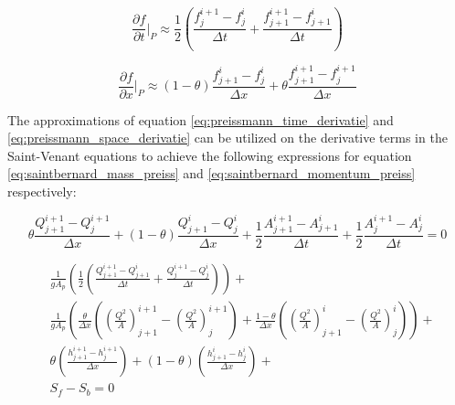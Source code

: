 \begin{equation}\label{eq:preissmann_time_derivatie}
    \frac{\partial f}{\partial t}\bigg \rvert_P \approx \frac{1}{2}\left(\frac{f_j^{i+1}-f_j^i}{\Delta t}+\frac{f_{j+1}^{i+1}-f_{j+1}^i}{\Delta t}\right)
\end{equation}

\begin{equation}\label{eq:preissmann_space_derivatie}
    \frac{\partial f}{\partial x}\bigg \rvert_P \approx (1-\theta)\frac{f_{j+1}^i-f_{j}^i}{\Delta x}+\theta \frac{f_{j+1}^{i+1}-f_{j}^{i+1}}{\Delta x}
\end{equation}

The approximations of equation \ref{eq:preissmann_time_derivatie} and \ref{eq:preissmann_space_derivatie} can be utilized on the derivative terms in the Saint-Venant equations to achieve the following expressions for equation \ref{eq:saintbernard_mass_preiss} and \ref{eq:saintbernard_momentum_preiss} respectively:

\begin{equation}\label{eq:continuity_eq_preissmann}
    \theta \frac{Q_{j+1}^{i+1}-Q_j^{i+1}}{\Delta x}+(1-\theta)\frac{Q_{j+1}^i - Q_j^i}{\Delta x}+
    \frac{1}{2}\frac{A_{j+1}^{i+1}-A_{j+1}^i}{\Delta t} + \frac{1}{2} \frac{A_{j}^{i+1} - A_j^i}{\Delta t} = 0
\end{equation}

\begin{equation}\label{eq:Momentum_eq_preissmann_discrete}
\begin{aligned}
    &\frac{1}{gA_p}\left(\frac{1}{2} \left(\frac{Q_{j+1}^{i+1}-Q_{j+1}^i}{\Delta t}+\frac{Q_{j}^{i+1} - Q_j^i}{\Delta t}\right)\right) +  \\[10pt]
   &\frac{1}{gA_p}\left(\frac{\theta}{\Delta x} \left(\left(\frac{Q^2}{A}\right)_{j+1}^{i+1}-\left(\frac{Q^2}{A}\right)_{j}^{i+1}\right) +  \frac{1-\theta}{\Delta x}\left(\left(\frac{Q^2}{A}\right)_{j+1}^{i}-\left(\frac{Q^2}{A}\right)_{j}^{i}\right) \right) + \\[10pt]
   &\theta \left(\frac{h_{j+1}^{i+1}-h_j^{i+1}}{\Delta x}\right)+ (1-\theta)\left(\frac{h_{j+1}^{i} - h_j^i}{\Delta x}\right) + \\[6pt] 
   &S_f-S_b= 0
    \end{aligned}
\end{equation}

